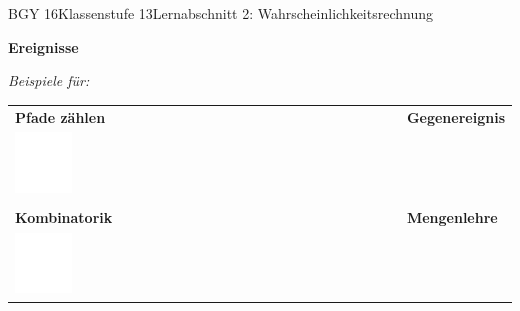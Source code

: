 \documentclass[oneside,openany,headings=optiontotoc,11pt,numbers=noenddot]{scrreprt}
\begin{document}
	\begin{worksheet}{BGY 16}{Klassenstufe 13}{Lernabschnitt 2: Wahrscheinlichkeitsrechnung}
				
		\noindent
		\sffamily
		\begin{framed}
			\noindent
			\huge{\textbf{Ereignisse}}\\
			\normalsize
			\par\noindent
			\textit{Beispiele für:}\\
			\par\noindent
			\begin{tabularx}{\textwidth}{X|X}
				\textbf{Pfade zählen} & \textbf{Gegenereignis}\\
				\includegraphics[width=0.15\textwidth]{../../empty.jpg} & \\
				\hline
				\hline
				\\
				\textbf{Kombinatorik} & \textbf{Mengenlehre}\\
				\includegraphics[width=0.15\textwidth]{../../empty.jpg} & \\
			\end{tabularx}
		\end{framed}
	\end{worksheet}
\end{document}
